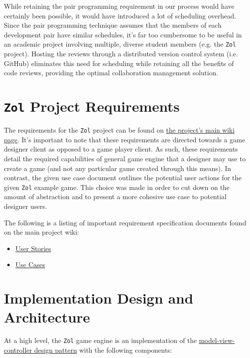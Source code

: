 \documentclass{article}
\newcommand{\projectname}[0] {\texttt{Zol} }
\newcommand{\hrefmvc}[1] {\href{http://en.wikipedia.org/wiki/Model\%E2\%80\%93view\%E2\%80\%93controller}{#1}}
\begin{document}
		While retaining the pair programming requirement in our process would
		have certainly been possible, it would have introduced a lot of
		scheduling overhead.  Since the pair programming technique assumes that 
		the members of each development pair have similar schedules, it's far
		too cumbersome to be useful in an academic project involving multiple,
		diverse student members (e.g. the \projectname project).  Hosting the
		reviews through a distributed version control system (i.e. GitHub) 
		eliminates this need for scheduling while retaining all the benefits 
		of code reviews, providing the optimal collaboration management solution.


	\section[Requirements]{\projectname Project Requirements}
	The requirements for the \projectname project can be found on 
	\href{https://github.com/NintenJoe/zol/wiki}{the project's main wiki page}.
	It's important to note that these requirements are directed towards a game
	designer client as opposed to a game player client.  As such, these
	requirements detail the required capabilities of general game engine that
	a designer may use to create a game (and not any particular game created
	through this means).  In contrast, the given use case document outlines 
	the potential user actions for the given \projectname example game.  This
	choice was made in order to cut down on the amount of abstraction and to
	present a more cohesive use case to potential designer users.

	The following is a listing of important requirement specification documents
	found on the main project wiki:

	\begin{itemize}
		\item \href{https://github.com/NintenJoe/zol/wiki#project-requirements-user-stories}{User Stories}
		\item \href{https://wiki.engr.illinois.edu/download/attachments/233410967/use-cases.pdf}{Use Cases}
	\end{itemize}


	\section[Architecture and Design]{Implementation Design and Architecture}
	At a high level, the \projectname game engine is an implementation of the
	\hrefmvc{model-view-controller design pattern} with the following components:
\end{document}
